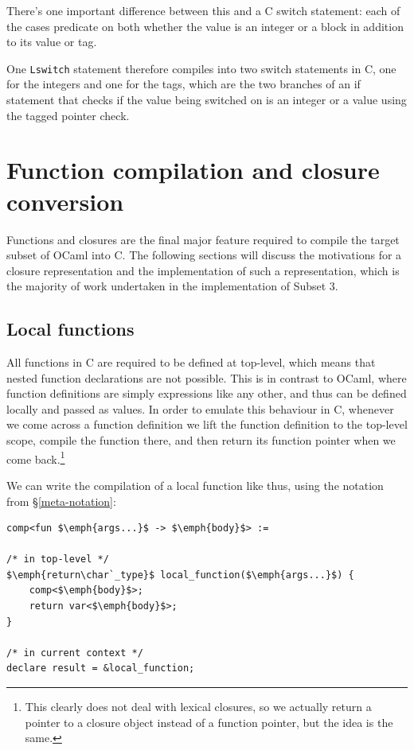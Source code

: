 There's one important difference between this and a C switch statement: each of
the cases predicate on both whether the value is an integer or a block in
addition to its value or tag.

One \texttt{Lswitch} statement therefore compiles into two switch statements in
C, one for the integers and one for the tags, which are the two branches of an
if statement that checks if the value being switched on is an integer or a value
using the tagged pointer check.

\section{Function compilation and closure conversion}\label{functions}

Functions and closures are the final major feature required to compile the
target subset of OCaml into C. The following sections will discuss the
motivations for a closure representation and the implementation of such a
representation, which is the majority of work undertaken in the implementation
of Subset 3.

\subsection{Local functions}

All functions in C are required to be defined at top-level, which means that 
nested function declarations are not possible. This is in contrast to OCaml, 
where function definitions are simply expressions like any other, and thus can 
be defined locally and passed as values. In order to emulate this behaviour in 
C, whenever we come across a function definition we lift the function 
definition to the top-level scope, compile the function there, and then return 
its function pointer when we come back.\footnote{This clearly does not deal 
with lexical closures, so we actually return a pointer to a closure object 
instead of a function pointer, but the idea is the same.}

We can write the compilation of a local function like thus, using the notation
from \S\ref{meta-notation}:

\begin{lstlisting}
comp<fun $\emph{args...}$ -> $\emph{body}$> :=

/* in top-level */
$\emph{return\char`_type}$ local_function($\emph{args...}$) {
    comp<$\emph{body}$>;
    return var<$\emph{body}$>;
}

/* in current context */
declare result = &local_function;
\end{lstlisting}

